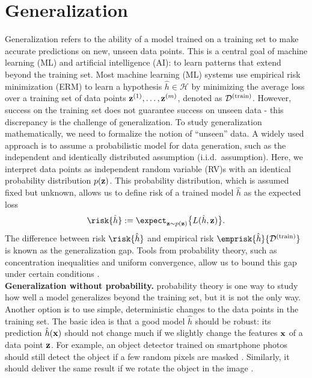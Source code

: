 \documentclass{article}
\begin{document}
\section*{Generalization}


 Generalization refers to the ability of a model trained on a training set to make accurate
 predictions on new, unseen data points. This is a central goal of machine learning (ML) and artificial intelligence (AI):
 to learn patterns that extend beyond the training set. Most machine learning (ML) systems
 use empirical risk minimization (ERM) to learn a hypothesis $\hat{h} \in \mathcal{H}$ by minimizing
 the average loss over a training set of data points ${\bf z}^{(1)}, \ldots, {\bf z}^{(m)}$,
 denoted as $\mathcal{D}^{(\rm train)}$. However, success on the training set does not guarantee success on
 unseen data - this discrepancy is the challenge of generalization. To study generalization
 mathematically, we need to formalize the notion of ``unseen'' data. A widely used
 approach is to assume a probabilistic model for data generation, such as the independent and identically distributed assumption (i.i.d.\ assumption).
 Here, we interpret data points as independent random variable (RV)s with an identical
 probability distribution $p({\bf z})$. This probability distribution, which is assumed fixed but unknown,
 allows us to define risk of a trained model $\hat{h}$ as the expected loss
 \[
 \risk{\hat{h}} := \expect_{{\bf z} \sim p({\bf z})} \big\{ L(\hat{h}, {\bf z}) \big\}.
 \]
 The difference between risk $\risk{\hat{h}}$ and empirical risk $\emprisk{\hat{h}}{\mathcal{D}^{(\rm train)}}$
 is known as the generalization gap. Tools from probability theory, such as concentration inequalities
 and uniform convergence, allow us to bound this gap under certain conditions \cite{ShalevMLBook}.\\
 {\bf Generalization without probability.} \Gls{probability} theory is one way to study how well a
 model generalizes beyond the training set, but it is not the only way. Another option is to use
 simple, deterministic changes to the data points in the training set. The basic idea is that a
 good model $\hat{h}$ should be robust: its prediction $\hat{h}({\bf x})$
 should not change much if we slightly change the features ${\bf x}$ of a data point ${\bf z}$.
 For example, an object detector trained on smartphone photos should still detect the object if a few
 random pixels are masked \cite{OnePixelAttack}. Similarly, it should deliver the same result if we rotate
 the object in the image \cite{MallatUnderstandingDeepLearning}.
\end{document}
